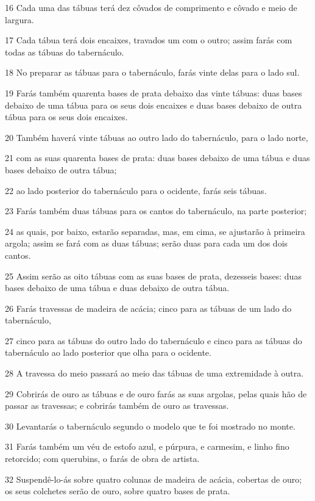 \par 16 Cada uma das tábuas terá dez côvados de comprimento e côvado e meio de largura.
\par 17 Cada tábua terá dois encaixes, travados um com o outro; assim farás com todas as tábuas do tabernáculo.
\par 18 No preparar as tábuas para o tabernáculo, farás vinte delas para o lado sul.
\par 19 Farás também quarenta bases de prata debaixo das vinte tábuas: duas bases debaixo de uma tábua para os seus dois encaixes e duas bases debaixo de outra tábua para os seus dois encaixes.
\par 20 Também haverá vinte tábuas ao outro lado do tabernáculo, para o lado norte,
\par 21 com as suas quarenta bases de prata: duas bases debaixo de uma tábua e duas bases debaixo de outra tábua;
\par 22 ao lado posterior do tabernáculo para o ocidente, farás seis tábuas.
\par 23 Farás também duas tábuas para os cantos do tabernáculo, na parte posterior;
\par 24 as quais, por baixo, estarão separadas, mas, em cima, se ajustarão à primeira argola; assim se fará com as duas tábuas; serão duas para cada um dos dois cantos.
\par 25 Assim serão as oito tábuas com as suas bases de prata, dezesseis bases: duas bases debaixo de uma tábua e duas debaixo de outra tábua.
\par 26 Farás travessas de madeira de acácia; cinco para as tábuas de um lado do tabernáculo,
\par 27 cinco para as tábuas do outro lado do tabernáculo e cinco para as tábuas do tabernáculo ao lado posterior que olha para o ocidente.
\par 28 A travessa do meio passará ao meio das tábuas de uma extremidade à outra.
\par 29 Cobrirás de ouro as tábuas e de ouro farás as suas argolas, pelas quais hão de passar as travessas; e cobrirás também de ouro as travessas.
\par 30 Levantarás o tabernáculo segundo o modelo que te foi mostrado no monte.
\par 31 Farás também um véu de estofo azul, e púrpura, e carmesim, e linho fino retorcido; com querubins, o farás de obra de artista.
\par 32 Suspendê-lo-ás sobre quatro colunas de madeira de acácia, cobertas de ouro; os seus colchetes serão de ouro, sobre quatro bases de prata.
